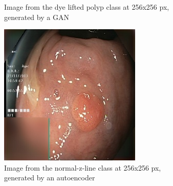 \begin{figure}[t]
\begin{subfigure}[b]{0.4\textwidth}
            \caption[Hate to be this guy]%
            {{\small Image from the dye lifted polyp class at 256x256 px, generated by a GAN}}    
            \label{fig:polypGAN}
        \end{subfigure}
        \qquad\vfill%
        \begin{subfigure}[b]{0.4\textwidth}   
            \centering 
            \includegraphics[width=\textwidth]{experiments/figures/both/greenAE.jpg}
            \caption[]%
            {{\small Image from the normal-z-line class at 256x256 px, generated by an autoencoder }}    
            \label{fig:zAE}
        \end{subfigure}
        \qquad%
        \begin{subfigure}[b]{0.4\textwidth}   
            \centering 

\end{subfigure}
\end{figure}

